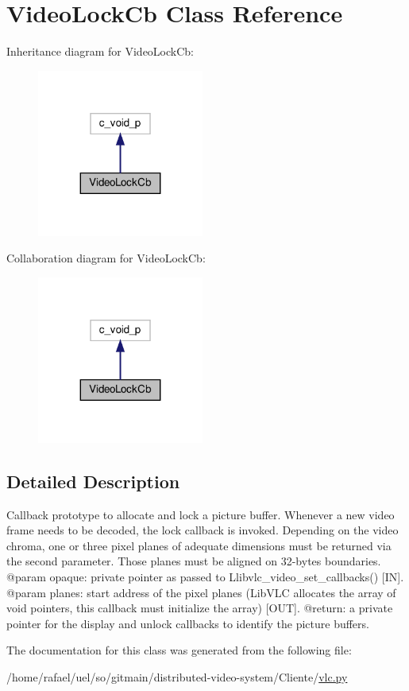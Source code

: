 \hypertarget{classvlc_1_1_video_lock_cb}{}\section{Video\+Lock\+Cb Class Reference}
\label{classvlc_1_1_video_lock_cb}


Inheritance diagram for Video\+Lock\+Cb\+:
\nopagebreak
\begin{figure}[H]
\begin{center}
\leavevmode
\includegraphics[width=155pt]{classvlc_1_1_video_lock_cb__inherit__graph}
\end{center}
\end{figure}


Collaboration diagram for Video\+Lock\+Cb\+:
\nopagebreak
\begin{figure}[H]
\begin{center}
\leavevmode
\includegraphics[width=155pt]{classvlc_1_1_video_lock_cb__coll__graph}
\end{center}
\end{figure}


\subsection{Detailed Description}
\begin{DoxyVerb}Callback prototype to allocate and lock a picture buffer.
Whenever a new video frame needs to be decoded, the lock callback is
invoked. Depending on the video chroma, one or three pixel planes of
adequate dimensions must be returned via the second parameter. Those
planes must be aligned on 32-bytes boundaries.
@param opaque: private pointer as passed to L{libvlc_video_set_callbacks}() [IN].
@param planes: start address of the pixel planes (LibVLC allocates the array of void pointers, this callback must initialize the array) [OUT].
@return: a private pointer for the display and unlock callbacks to identify the picture buffers.
\end{DoxyVerb}
 

The documentation for this class was generated from the following file\+:\begin{DoxyCompactItemize}
\item 
/home/rafael/uel/so/gitmain/distributed-\/video-\/system/\+Cliente/\hyperlink{vlc_8py}{vlc.\+py}\end{DoxyCompactItemize}
